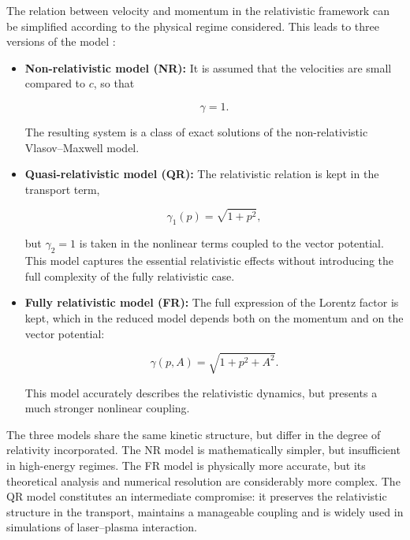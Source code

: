 \documentclass[11pt,a4paper,twoside,pdf]{article}
\numberwithin{equation}{section}
\begin{document}
The relation between velocity and momentum in the relativistic framework can be simplified according to the physical regime
considered. This leads to three versions of the model \cite{janssen2022gravitacion}:

\begin{itemize}
\item \textbf{Non-relativistic model (NR):}
It is assumed that the velocities are small compared to $c$, so that


\[
\gamma = 1.
\]


The resulting system is a class of exact solutions of the
non-relativistic Vlasov--Maxwell model.

\item \textbf{Quasi-relativistic model (QR):}
The relativistic relation is kept in the transport term,


\[
\gamma_1(p)=\sqrt{1+p^2},
\]


but $\gamma_2=1$ is taken in the nonlinear terms coupled to the vector
potential. This model captures the essential relativistic effects without introducing the
full complexity of the fully relativistic case.

\item \textbf{Fully relativistic model (FR):}
The full expression of the Lorentz factor is kept, which in the reduced
model depends both on the momentum and on the vector potential:


\[
\gamma(p,A)=\sqrt{1+p^2 + A^2}.
\]


This model accurately describes the relativistic dynamics, but presents a
much stronger nonlinear coupling.
\end{itemize}


The three models share the same kinetic structure, but differ in the degree
of relativity incorporated. The NR model is mathematically simpler, but
insufficient in high-energy regimes. The FR model is physically more accurate,
but its theoretical analysis and numerical resolution are considerably more
complex. The QR model constitutes an intermediate compromise: it preserves the
relativistic structure in the transport, maintains a manageable coupling and is
widely used in simulations of laser--plasma interaction.






\end{document}
